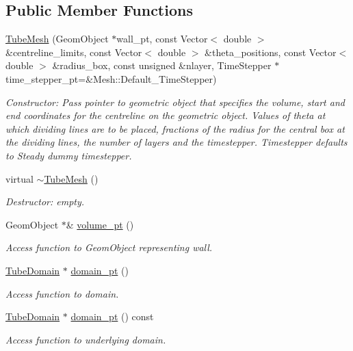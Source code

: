 \subsection*{Public Member Functions}
\begin{DoxyCompactItemize}
\item 
\hyperlink{classoomph_1_1TubeMesh_a6c2aaa81de6298a3f3a7bf1ae4d2b11d}{Tube\+Mesh} (Geom\+Object $\ast$wall\+\_\+pt, const Vector$<$ double $>$ \&centreline\+\_\+limits, const Vector$<$ double $>$ \&theta\+\_\+positions, const Vector$<$ double $>$ \&radius\+\_\+box, const unsigned \&nlayer, Time\+Stepper $\ast$time\+\_\+stepper\+\_\+pt=\&Mesh\+::\+Default\+\_\+\+Time\+Stepper)
\begin{DoxyCompactList}\small\item\em Constructor\+: Pass pointer to geometric object that specifies the volume, start and end coordinates for the centreline on the geometric object. Values of theta at which dividing lines are to be placed, fractions of the radius for the central box at the dividing lines, the number of layers and the timestepper. Timestepper defaults to Steady dummy timestepper. \end{DoxyCompactList}\item 
virtual \hyperlink{classoomph_1_1TubeMesh_af77e5d5022c77c3bf7340387258b2d51}{$\sim$\+Tube\+Mesh} ()
\begin{DoxyCompactList}\small\item\em Destructor\+: empty. \end{DoxyCompactList}\item 
Geom\+Object $\ast$\& \hyperlink{classoomph_1_1TubeMesh_a152971dbd327aaf840fd157bad87d995}{volume\+\_\+pt} ()
\begin{DoxyCompactList}\small\item\em Access function to Geom\+Object representing wall. \end{DoxyCompactList}\item 
\hyperlink{classoomph_1_1TubeDomain}{Tube\+Domain} $\ast$ \hyperlink{classoomph_1_1TubeMesh_a96715b52dbbccaaf89d722a05e57e28a}{domain\+\_\+pt} ()
\begin{DoxyCompactList}\small\item\em Access function to domain. \end{DoxyCompactList}\item 
\hyperlink{classoomph_1_1TubeDomain}{Tube\+Domain} $\ast$ \hyperlink{classoomph_1_1TubeMesh_a223a82a89304553d71b279aa6fe045fd}{domain\+\_\+pt} () const
\begin{DoxyCompactList}\small\item\em Access function to underlying domain. \end{DoxyCompactList}\end{DoxyCompactItemize}
